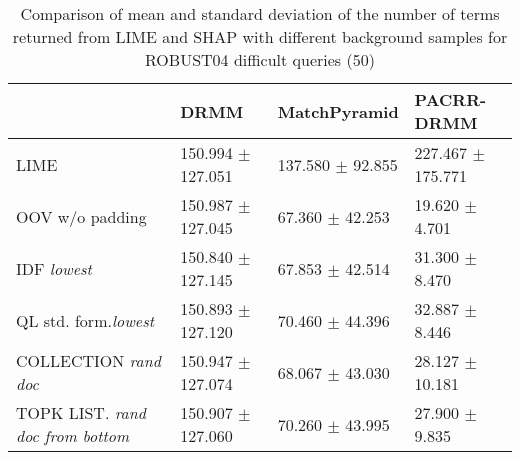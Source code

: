 \begin{table}
\begin{tabular}{m{8em}m{8em}m{8em}m{8em}}
 \toprule
 & DRMM & MatchPyramid & PACRR-DRMM \\
 \midrule
LIME & 150.994 $\pm$ 127.051 & 137.580 $\pm$ 92.855 & 227.467 $\pm$ 175.771\\


OOV w/o padding & 150.987 $\pm$ 127.045 & 67.360 $\pm$ 42.253 & 19.620 $\pm$ 4.701\\

IDF \newline \textit{lowest} & 150.840 $\pm$ 127.145 & 67.853 $\pm$ 42.514 & 31.300 $\pm$ 8.470\\

QL std. form.\newline \textit{lowest} & 150.893 $\pm$ 127.120 & 70.460 $\pm$ 44.396 & 32.887 $\pm$ 8.446\\




COLLECTION \newline \textit{rand doc} & 150.947 $\pm$ 127.074 & 68.067 $\pm$ 43.030 & 28.127 $\pm$ 10.181\\

TOPK LIST. \newline \textit{rand doc from bottom} & 150.907 $\pm$ 127.060 & 70.260 $\pm$ 43.995 & 27.900 $\pm$ 9.835\\
\bottomrule

 \end{tabular}
\caption{Comparison of mean and standard deviation of the number of terms returned from LIME and SHAP with different background samples for ROBUST04 difficult queries (50)}
\label{table_diff_mean_std_terms}
\end{table}